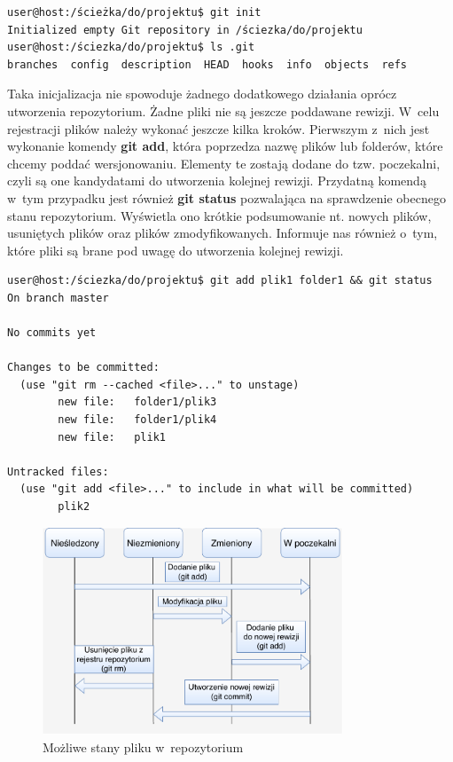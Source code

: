 \begin{lstlisting}[language=bash,language=Cmd,caption={Inicjalizacja repozytorium git}]
user@host:/ścieżka/do/projektu$ git init
Initialized empty Git repository in /ściezka/do/projektu
user@host:/ściezka/do/projektu$ ls .git
branches  config  description  HEAD  hooks  info  objects  refs
\end{lstlisting}

Taka inicjalizacja nie spowoduje żadnego dodatkowego działania oprócz utworzenia repozytorium. Żadne pliki nie są jeszcze poddawane rewizji. W~celu rejestracji plików należy wykonać jeszcze kilka kroków. Pierwszym z~nich jest wykonanie komendy \textbf{git add}, która poprzedza nazwę plików lub folderów, które chcemy poddać wersjonowaniu. Elementy te zostają dodane do tzw. poczekalni, czyli są one kandydatami do utworzenia kolejnej rewizji. Przydatną komendą w~tym przypadku jest również \textbf{git status} pozwalająca na sprawdzenie obecnego stanu repozytorium. Wyświetla ono krótkie podsumowanie nt. nowych plików, usuniętych plików oraz plików zmodyfikowanych. Informuje nas również o~tym, które pliki są brane pod uwagę do utworzenia kolejnej rewizji.

\begin{lstlisting}[language=Cmd,caption={Dodawanie elementów do poczekalni}, frame=none]
user@host:/ściezka/do/projektu$ git add plik1 folder1 && git status
On branch master

No commits yet

Changes to be committed:
  (use "git rm --cached <file>..." to unstage)
        new file:   folder1/plik3
        new file:   folder1/plik4
        new file:   plik1

Untracked files:
  (use "git add <file>..." to include in what will be committed)
        plik2
\end{lstlisting}

\begin{figure}[H]
\centering
\includegraphics[width=0.8\textwidth]{res/fileStates.pdf}
\caption{Możliwe stany pliku w~repozytorium \cite{GitChart}} 
\end{figure}

